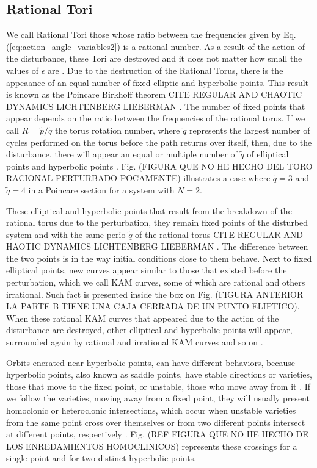 \subsection{Rational Tori}
We call Rational Tori those whose ratio between the frequencies given by Eq.(\ref{eq:action_angle_variables2}) is a rational number. As a result of the action of the disturbance, these Tori are destroyed and it does not matter how small the values of $\epsilon$ are \cite{ottChaosDynamicalSystems2002}. Due to the destruction of the Rational Torus, there is the appeaance of an equal number of fixed elliptic and hyperbolic points. This result is known as the Poincar\´e Birkhoff theorem CITE REGULAR AND CHAOTIC DYNAMICS LICHTENBERG LIEBERMAN . The number of fixed points that appear depends on the ratio between the frequencies of the rational torus. If we call $R=\tilde{p}/\tilde{q}$ the torus rotation number, where $\tilde{q}$ represents the largest number of cycles performed on the torus before the path returns over itself, then, due to the disturbance, there will appear an equal or multiple number of $\tilde{q}$ of elliptical points and hyperbolic points \cite{ottChaosDynamicalSystems2002}. Fig. (FIGURA QUE NO HE HECHO DEL TORO RACIONAL PERTURBADO POCAMENTE) illustrates a case where $\tilde{q}=3$ and $\tilde{q}=4$ in a Poincar\´e section for a system with $N=2$.\par

These elliptical and hyperbolic points that result from the breakdown of the rational torus due to the perturbation, they remain fixed points of the disturbed system and with the same perio $\tilde{q}$ of the rational torus CITE REGULAR AND HAOTIC DYNAMICS LICHTENBERG LIEBERMAN . The difference between the two points is in the way initial conditions close to them behave. Next to fixed elliptical points, new curves appear similar to those that existed before the perturbation, which we call KAM curves, some of which are rational and others irrational. Such fact is presented inside the box on Fig. (FIGURA ANTERIOR LA PARTE B TIENE UNA CAJA CERRADA DE UN PUNTO ELIPTICO). When these rational KAM curves that appeared due to the action of the disturbance are destroyed, other elliptical and hyperbolic points will appear, surrounded again by rational and irrational KAM curves and so on \cite{ottChaosDynamicalSystems2002}.\par

Orbits enerated near hyperbolic points, can have different behaviors, because hyperbolic points, also known as saddle points, have stable directions or varieties, those that move to the fixed point, or unstable, those who move away from it \cite{ottChaosDynamicalSystems2002}. If we follow the varieties, moving away from a fixed point, they will usually present homoclonic or heteroclonic intersections, which occur when unstable varieties from the same point cross over themselves or from two different points intersect at different points, respectively \cite{ottChaosDynamicalSystems2002}. Fig. (REF FIGURA QUE NO HE HECHO DE LOS ENREDAMIENTOS HOMOCLINICOS) represents these crossings for a single point and for two distinct hyperbolic points.\par 

